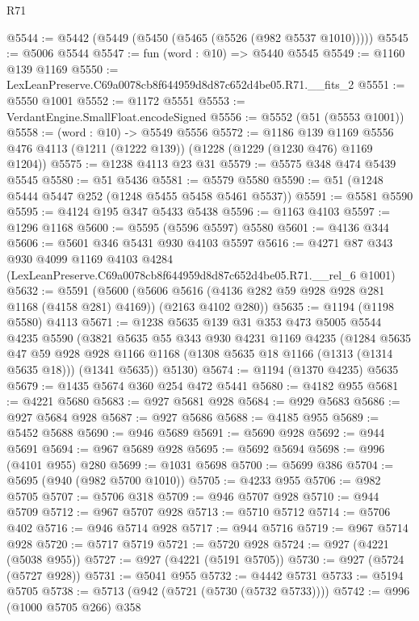 \begin{lexlean}{R71}
\begin{coremodule}
@5544 := @5442 (@5449 (@5450 (@5465 (@5526 (@982 @5537 @1010)))))
@5545 := @5006 @5544
@5547 := fun (word : @10) => @5440 @5545
@5549 := @1160 @139 @1169
@5550 := LexLeanPreserve.C69a0078cb8f644959d8d87c652d4be05.R71.__fits_2
@5551 := @5550 @1001
@5552 := @1172 @5551
@5553 := VerdantEngine.SmallFloat.encodeSigned
@5556 := @5552 (@51 (@5553 @1001))
@5558 := (word : @10) -> @5549 @5556
@5572 := @1186
    @139
    @1169
    @5556
    @476
    @4113
    (@1211 (@1222 @139))
    (@1228 (@1229 (@1230 @476) @1169 @1204))
@5575 := @1238 @4113 @23 @31
@5579 := @5575 @348 @474 @5439 @5545
@5580 := @51 @5436
@5581 := @5579 @5580
@5590 := @51 (@1248 @5444 @5447 @252 (@1248 @5455 @5458 @5461 @5537))
@5591 := @5581 @5590
@5595 := @4124 @195 @347 @5433 @5438
@5596 := @1163 @4103
@5597 := @1296 @1168
@5600 := @5595 (@5596 @5597) @5580
@5601 := @4136 @344
@5606 := @5601 @346 @5431 @930 @4103 @5597
@5616 := @4271
    @87
    @343
    @930
    @4099
    @1169
    @4103
    @4284
    (LexLeanPreserve.C69a0078cb8f644959d8d87c652d4be05.R71.__rel_6 @1001)
@5632 := @5591
    (@5600
      (@5606 @5616 (@4136 @282 @59 @928 @928 @281 @1168 (@4158 @281) @4169))
      (@2163 @4102 @280))
@5635 := @1194 (@1198 @5580) @4113
@5671 := @1238
    @5635
    @139
    @31
    @353
    @473
    @5005
    @5544
    @4235
    @5590
    (@3821
      @5635
      @55
      @343
      @930
      @4231
      @1169
      @4235
      (@1284
        @5635
        @47
        @59
        @928
        @928
        @1166
        @1168
        (@1308 @5635 @18 @1166 (@1313 (@1314 @5635 @18)))
        (@1341 @5635))
      @5130)
@5674 := @1194 (@1370 @4235) @5635
@5679 := @1435 @5674 @360 @254 @472 @5441
@5680 := @4182 @955
@5681 := @4221 @5680
@5683 := @927 @5681 @928
@5684 := @929 @5683
@5686 := @927 @5684 @928
@5687 := @927 @5686
@5688 := @4185 @955
@5689 := @5452 @5688
@5690 := @946 @5689
@5691 := @5690 @928
@5692 := @944 @5691
@5694 := @967 @5689 @928
@5695 := @5692 @5694
@5698 := @996 (@4101 @955) @280
@5699 := @1031 @5698
@5700 := @5699 @386
@5704 := @5695 (@940 (@982 @5700 @1010))
@5705 := @4233 @955
@5706 := @982 @5705
@5707 := @5706 @318
@5709 := @946 @5707 @928
@5710 := @944 @5709
@5712 := @967 @5707 @928
@5713 := @5710 @5712
@5714 := @5706 @402
@5716 := @946 @5714 @928
@5717 := @944 @5716
@5719 := @967 @5714 @928
@5720 := @5717 @5719
@5721 := @5720 @928
@5724 := @927 (@4221 (@5038 @955))
@5727 := @927 (@4221 (@5191 @5705))
@5730 := @927 (@5724 (@5727 @928))
@5731 := @5041 @955
@5732 := @4442 @5731
@5733 := @5194 @5705
@5738 := @5713 (@942 (@5721 (@5730 (@5732 @5733))))
@5742 := @996 (@1000 @5705 @266) @358

\end{coremodule}
\end{lexlean}
